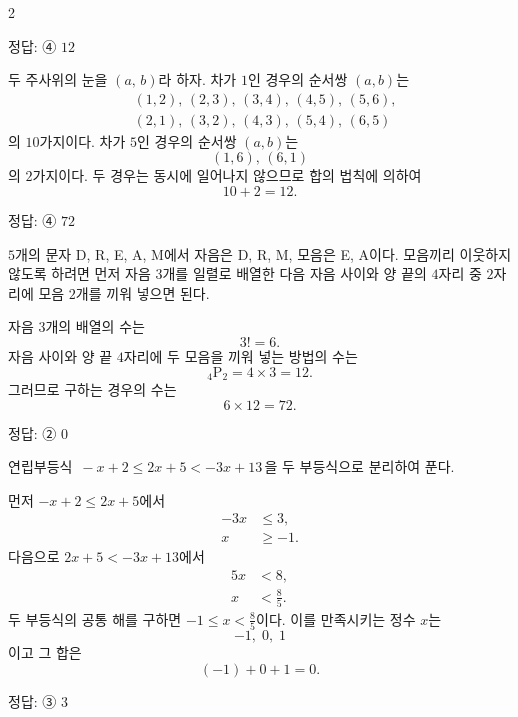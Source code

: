 \documentclass[10pt]{article}
\begin{document}
\raggedcolumns
\begin{multicols}{2}

\begin{answerbox}정답: ④ $12$\end{answerbox}

두 주사위의 눈을 $(a,\,b)$라 하자. 차가 $1$인 경우의 순서쌍 $(a,b)$는
\begin{align*}
&(1,2),\,(2,3),\,(3,4),\,(4,5),\,(5,6), \\
&(2,1),\,(3,2),\,(4,3),\,(5,4),\,(6,5)
\end{align*}
의 $10$가지이다. 차가 $5$인 경우의 순서쌍 $(a,b)$는
\[ (1,6),\,(6,1) \]
의 $2$가지이다. 두 경우는 동시에 일어나지 않으므로 합의 법칙에 의하여
\[ 10 + 2 = 12. \]

\begin{answerbox}정답: ④ $72$\end{answerbox}

$5$개의 문자 D, R, E, A, M에서 자음은 D, R, M, 모음은 E, A이다. 모음끼리 이웃하지 않도록 하려면 먼저 자음 $3$개를 일렬로 배열한 다음 자음 사이와 양 끝의 $4$자리 중 $2$자리에 모음 $2$개를 끼워 넣으면 된다.

자음 $3$개의 배열의 수는
\[ 3! = 6. \]
자음 사이와 양 끝 $4$자리에 두 모음을 끼워 넣는 방법의 수는
\[ {}_4\mathrm{P}_2 = 4 \times 3 = 12. \]
그러므로 구하는 경우의 수는
\[ 6 \times 12 = 72. \]

\begin{answerbox}정답: ② $0$\end{answerbox}

연립부등식 $\,-x + 2 \le 2x + 5 < -3x + 13\,$을 두 부등식으로 분리하여 푼다.

먼저 $-x + 2 \le 2x + 5$에서
\begin{align*}
-3x &\le 3, \\
x &\ge -1.
\end{align*}
다음으로 $2x + 5 < -3x + 13$에서
\begin{align*}
5x &< 8, \\
x &< \tfrac{8}{5}.
\end{align*}
두 부등식의 공통 해를 구하면 $-1 \le x < \tfrac{8}{5}$이다. 이를 만족시키는 정수 $x$는
\[ -1,\;0,\;1 \]
이고 그 합은
\[ (-1) + 0 + 1 = 0. \]

\begin{answerbox}정답: ③ $3$\end{answerbox}


\end{multicols}
\end{document}
